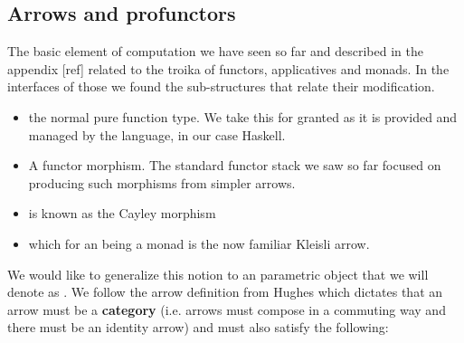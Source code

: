 \subsection{Arrows and profunctors}

The basic element of computation we have seen so far and described in
the appendix [ref] related to the troika of functors, applicatives and
monads. In the interfaces of those we found the sub-structures that
relate their modification.

\begin{itemize}
\item {} the normal pure function type. We take this for granted as
it is provided and managed by the language, in our case Haskell.
\item {} A functor morphism. The standard functor stack we saw
so far focused on producing such morphisms from simpler arrows.
\item {} is known as the Cayley morphism
\item {} which for an  being a monad is the now familiar
Kleisli arrow.
\end{itemize}

We would like to generalize this notion to an parametric object that
we will denote as \hask{~>}. We follow the arrow definition from
Hughes \cite{hughesProgrammingArrows2005} which dictates that an arrow
must be a \textbf{category} (i.e. arrows must compose in a commuting
way and there must be an identity arrow) and must also satisfy the
following:

